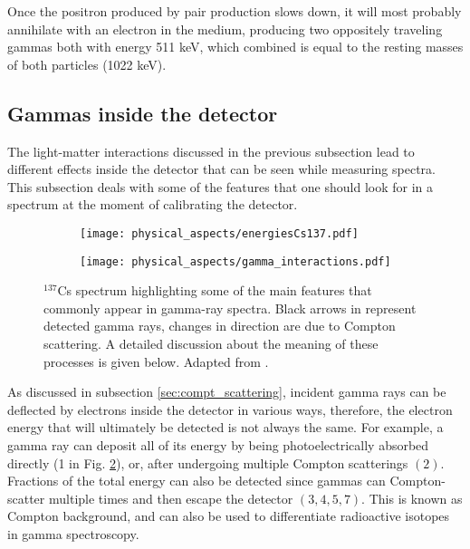 Once the positron produced by pair production slows down, it will most probably annihilate with an electron in the medium, producing two oppositely traveling gammas both with energy 511 \unit{\kilo\eV}, which combined is equal to the resting masses of both particles (1022 \unit{\kilo\eV}).

\subsection{Gammas inside the detector}\label{sec:gammas_in_the_detector}

The light-matter interactions discussed in the previous subsection lead to different effects inside the detector that can be seen while measuring spectra. This subsection deals with some of the features that one should look for in a spectrum at the moment of calibrating the detector.

\begin{figure}[H]
  \centering
  \begin{subfigure}[t]{0.7\textwidth}
    \texttt{[image: physical\_aspects/energiesCs137.pdf]}
    \caption{\label{sfig:spectrum_description}}
  \end{subfigure}
  \hfill
  \begin{subfigure}[t]{0.28\textwidth}
    \texttt{[image: physical\_aspects/gamma\_interactions.pdf]}
    \caption{\label{sfig:gamma_scattering}}
  \end{subfigure}
  \caption{\label{fig:Cs137_description}$^{137}$Cs spectrum highlighting some of the main features that commonly appear in gamma-ray spectra. Black arrows in  represent detected gamma rays, changes in direction are due to Compton scattering. A detailed discussion about the meaning of these processes is given below. Adapted from \cite{Notas-instrumentacion}.}
\end{figure}

As discussed in subsection \ref{sec:compt_scattering}, incident gamma rays can be deflected by electrons inside the detector in various ways, therefore, the electron energy that will ultimately be detected is not always the same. For example, a gamma ray can deposit all of its energy by being photoelectrically absorbed directly (1 in Fig. \ref{sfig:gamma_scattering}), or, after undergoing multiple Compton scatterings $(2)$. Fractions of the total energy can also be detected since gammas can Compton-scatter multiple times and then escape the detector $(3, 4, 5, 7)$. This is known as Compton background, and can also be used to differentiate radioactive isotopes in gamma spectroscopy.

